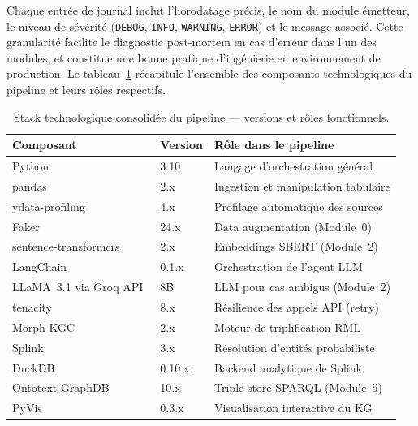 Chaque entrée de journal inclut l'horodatage précis, le nom du module
émetteur, le niveau de sévérité (\texttt{DEBUG}, \texttt{INFO},
\texttt{WARNING}, \texttt{ERROR}) et le message associé. Cette
granularité facilite le diagnostic post-mortem en cas d'erreur dans
l'un des modules, et constitue une bonne pratique d'ingénierie en
environnement de production. Le tableau~\ref{tab:stack_outils} récapitule
l'ensemble des composants technologiques du pipeline et leurs rôles
respectifs.

\begin{table}[h]
\centering
\caption{Stack technologique consolidée du pipeline --- versions et
         rôles fonctionnels.}
\label{tab:stack_outils}
\begin{tabular}{p{4.8cm}p{1.8cm}p{6cm}}
\hline
\textbf{Composant} & \textbf{Version} & \textbf{Rôle dans le pipeline} \\
\hline
Python                                     & 3.10   & Langage d'orchestration général \\
pandas~\cite{pandas2020}                   & 2.x    & Ingestion et manipulation tabulaire \\
ydata-profiling~\cite{ydataprofiling2023}  & 4.x    & Profilage automatique des sources \\
Faker~\cite{faker2024}                     & 24.x   & Data augmentation (Module~0) \\
sentence-transformers~\cite{reimers2019sbert} & 2.x & Embeddings SBERT (Module~2) \\
LangChain~\cite{langchain2023}        & 0.1.x  & Orchestration de l'agent LLM \\
LLaMA~3.1 via Groq API~\cite{groq2024}    & 8B     & LLM pour cas ambigus (Module~2) \\
tenacity                                   & 8.x    & Résilience des appels API (retry) \\
Morph-KGC~\cite{arenas2023morphkgc}        & 2.x    & Moteur de triplification RML \\
Splink~\cite{splink2023}            & 3.x    & Résolution d'entités probabiliste \\
DuckDB~\cite{raasveldt2019duckdb}                   & 0.10.x & Backend analytique de Splink \\
Ontotext GraphDB~\cite{ontotext2024graphdb}        & 10.x   & Triple store SPARQL (Module~5) \\
PyVis~\cite{pyvis2023}                     & 0.3.x  & Visualisation interactive du KG \\
\hline
\end{tabular}
\end{table}

